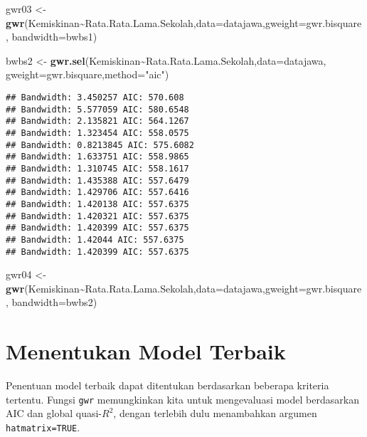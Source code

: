 \documentclass[
]{book}
\newenvironment{Shaded}{\begin{snugshade}}{\end{snugshade}}
\newcommand{\DataTypeTok}[1]{\textcolor[rgb]{0.13,0.29,0.53}{#1}}
\newcommand{\KeywordTok}[1]{\textcolor[rgb]{0.13,0.29,0.53}{\textbf{#1}}}
\newcommand{\NormalTok}[1]{#1}
\newcommand{\OperatorTok}[1]{\textcolor[rgb]{0.81,0.36,0.00}{\textbf{#1}}}
\newcommand{\StringTok}[1]{\textcolor[rgb]{0.31,0.60,0.02}{#1}}
\begin{document}
\begin{Shaded}
\begin{Highlighting}[]
\NormalTok{gwr03 \textless{}{-}}\StringTok{ }\KeywordTok{gwr}\NormalTok{(Kemiskinan}\OperatorTok{\textasciitilde{}}\NormalTok{Rata.Rata.Lama.Sekolah,}\DataTypeTok{data=}\NormalTok{datajawa,}\DataTypeTok{gweight=}\NormalTok{gwr.bisquare,}
    \DataTypeTok{bandwidth=}\NormalTok{bwbs1)}

\NormalTok{bwbs2 \textless{}{-}}\StringTok{ }\KeywordTok{gwr.sel}\NormalTok{(Kemiskinan}\OperatorTok{\textasciitilde{}}\NormalTok{Rata.Rata.Lama.Sekolah,}\DataTypeTok{data=}\NormalTok{datajawa,}
                 \DataTypeTok{gweight=}\NormalTok{gwr.bisquare,}\DataTypeTok{method=}\StringTok{"aic"}\NormalTok{)}
\end{Highlighting}
\end{Shaded}

\begin{verbatim}
## Bandwidth: 3.450257 AIC: 570.608 
## Bandwidth: 5.577059 AIC: 580.6548 
## Bandwidth: 2.135821 AIC: 564.1267 
## Bandwidth: 1.323454 AIC: 558.0575 
## Bandwidth: 0.8213845 AIC: 575.6082 
## Bandwidth: 1.633751 AIC: 558.9865 
## Bandwidth: 1.310745 AIC: 558.1617 
## Bandwidth: 1.435388 AIC: 557.6479 
## Bandwidth: 1.429706 AIC: 557.6416 
## Bandwidth: 1.420138 AIC: 557.6375 
## Bandwidth: 1.420321 AIC: 557.6375 
## Bandwidth: 1.420399 AIC: 557.6375 
## Bandwidth: 1.42044 AIC: 557.6375 
## Bandwidth: 1.420399 AIC: 557.6375
\end{verbatim}

\begin{Shaded}
\begin{Highlighting}[]
\NormalTok{gwr04 \textless{}{-}}\StringTok{ }\KeywordTok{gwr}\NormalTok{(Kemiskinan}\OperatorTok{\textasciitilde{}}\NormalTok{Rata.Rata.Lama.Sekolah,}\DataTypeTok{data=}\NormalTok{datajawa,}\DataTypeTok{gweight=}\NormalTok{gwr.bisquare,}
    \DataTypeTok{bandwidth=}\NormalTok{bwbs2)}
\end{Highlighting}
\end{Shaded}

\hypertarget{menentukan-model-terbaik}{%
\section{Menentukan Model Terbaik}\label{menentukan-model-terbaik}}

Penentuan model terbaik dapat ditentukan berdasarkan beberapa kriteria tertentu. Fungsi \texttt{gwr} memungkinkan kita untuk mengevaluasi model berdasarkan AIC dan global quasi-\(R^2\), dengan terlebih dulu menambahkan argumen \texttt{hatmatrix=TRUE}.
\end{document}
